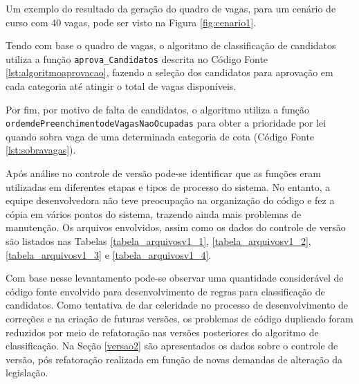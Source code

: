 Um exemplo do resultado da geração do quadro de vagas, para um cenário de curso com 40 vagas,  pode ser visto na Figura \ref{fig:cenario1}.



\newpage
Tendo com base o quadro de vagas, o algoritmo de classificação de candidatos utiliza a função \texttt{aprova\_Candidatos} descrita no Código Fonte \ref{lst:algoritmoaprovacao}, fazendo a seleção dos candidatos para aprovação em cada categoria até atingir o total de vagas disponíveis. 



Por fim, por motivo de falta de candidatos, o algoritmo utiliza a função \newline \texttt{ordemdePreenchimentodeVagasNaoOcupadas} para obter a prioridade por lei quando sobra vaga de uma determinada categoria de cota (Código Fonte \ref{lst:sobravagas}).

\newpage


Após análise no controle de versão pode-se identificar que as funções eram utilizadas em diferentes etapas e tipos de processo do sistema. No entanto, a equipe desenvolvedora não teve preocupação na organização do código e fez a cópia em vários pontos do sistema, trazendo ainda mais problemas de manutenção. Os arquivos envolvidos, assim como os dados do controle de versão são listados nas Tabelas \ref{tabela_arquivosv1_1}, \ref{tabela_arquivosv1_2}, \ref{tabela_arquivosv1_3} e \ref{tabela_arquivosv1_4}.



\newpage
Com base nesse levantamento pode-se observar uma quantidade considerável de código fonte envolvido para desenvolvimento de regras para classificação de candidatos. Como tentativa de dar celeridade no processo de desenvolvimento de correções e na criação de futuras versões, os problemas de código duplicado foram reduzidos por meio de refatoração nas versões posteriores do algoritmo de classificação. Na Seção \ref{versao2} são apresentados os dados sobre o controle de versão, pós refatoração realizada em função de novas demandas de alteração da legislação.
